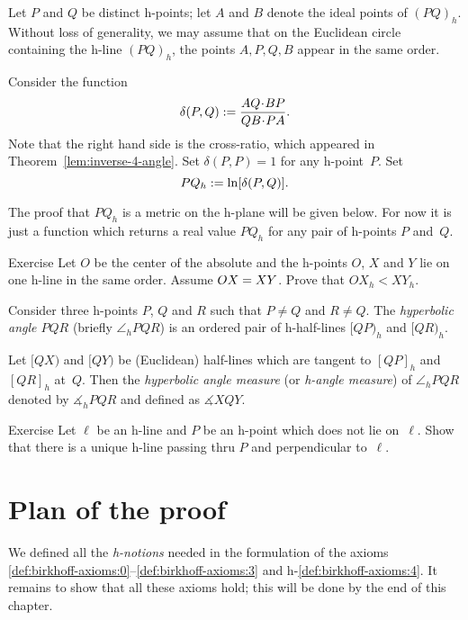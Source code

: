\label{h-dist}
Let $P$ and $Q$ be distinct h-points;
let $A$ and $B$ denote the ideal points of $(PQ)_h$.
Without loss of generality, we may assume that on the Euclidean circle containing the h-line $(PQ)_h$, the points $A,P,Q,B$ appear in the same order.

Consider the function 
$$\delta(P,Q)\df\frac{AQ\cdot BP}{QB\cdot PA}.$$
Note that the right hand side is the cross-ratio, 
which appeared in Theorem~\ref{lem:inverse-4-angle}.
Set $\delta(P,P)=1$ for any h-point~$P$.
Set 
$$PQ_h:=\ln[\delta(P,Q)].$$

The proof that $PQ_h$ is a metric on the h-plane will be given below.
For now it is just a function which returns a real value $PQ_h$ for any pair of h-points $P$ and~$Q$.

\begin{thm}{Exercise}\label{ex:h-dist-eq}
Let $O$ be the center of the absolute and the h-points $O$, $X$ and $Y$ lie on one h-line in the same order.
Assume $OX\z=XY$.
Prove that $OX_h<XY_h$.
\end{thm}


\label{h-angle measure}
Consider three h-points $P$, $Q$ and $R$
such that $P\ne Q$ and $R\ne Q$.
The \emph{hyperbolic angle $PQR$} (briefly $\angle_h PQR$) is an ordered pair of h-half-lines $[QP)_h$ and $[QR)_h$.

Let $[QX)$ and $[QY)$ be (Euclidean) half-lines 
which are tangent to $[QP]_h$ and $[QR]_h$ 
at~$Q$.
Then the \emph{hyperbolic angle measure} (or \emph{h-angle measure})  of $\angle_h PQR$ denoted by
$\measuredangle_h PQR$ and defined as
$\measuredangle XQY$.

\begin{thm}{Exercise}\label{ex:h-perp-unique}
Let $\ell$ be an h-line and $P$ be an h-point which does not lie on~$\ell$.
Show that there is a unique h-line passing thru $P$ 
and perpendicular to~$\ell$.
\end{thm}

\section*{Plan of the proof}

We defined all the {}\emph{h-notions} needed in the formulation of the axioms \ref{def:birkhoff-axioms:0}--\ref{def:birkhoff-axioms:3} and h-\ref{def:birkhoff-axioms:4}.
It remains to show that all these axioms hold; 
this will be done by the end of this chapter.

